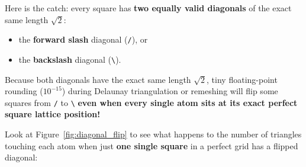 \documentclass[11pt,a4paper]{article}
\newcommand{\code}[1]{\texttt{#1}}
\begin{document}
Here is the catch: every square has \textbf{two equally valid diagonals} of the exact same length
$\sqrt{2}$:
\begin{itemize}[noitemsep]
  \item the \textbf{forward slash} diagonal (\code{/}), or
  \item the \textbf{backslash} diagonal (\code{\textbackslash}).
\end{itemize}
Because both diagonals have the exact same length $\sqrt{2}$, tiny floating-point rounding ($10^{-15}$)
during Delaunay triangulation or remeshing will flip some squares from \code{/} to \code{\textbackslash}
\textbf{even when every single atom sits at its exact perfect square lattice position!}

Look at Figure~\ref{fig:diagonal_flip} to see what happens to the number of triangles touching each
atom when just \textbf{one single square} in a perfect grid has a flipped diagonal:
\end{document}
